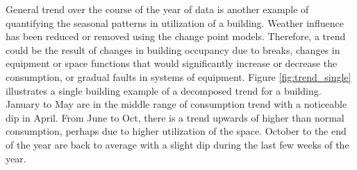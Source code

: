 General trend over the course of the year of data is another example of quantifying the seasonal patterns in utilization of a building. Weather influence has been reduced or removed using the change point models. Therefore, a trend could be the result of changes in building occupancy due to breaks, changes in equipment or space functions that would significantly increase or decrease the consumption, or gradual faults in systems of equipment. Figure \ref{fig:trend_single} illustrates a single building example of a decomposed trend for a building. January to May are in the middle range of consumption trend with a noticeable dip in April. From June to Oct, there is a trend upwards of higher than normal consumption, perhaps due to higher utilization of the space. October to the end of the year are back to average with a slight dip during the last few weeks of the year.